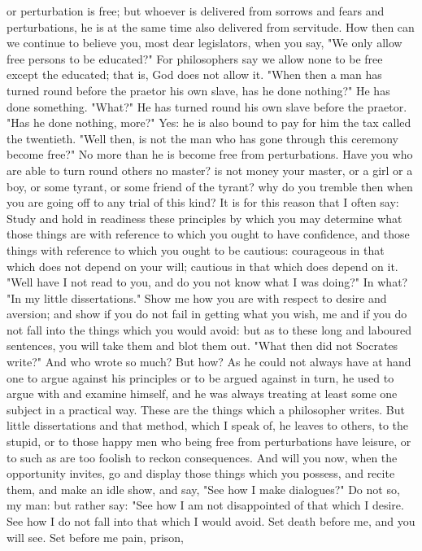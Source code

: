 \documentclass[a4paper]{article}
\begin{document}
or perturbation is free; but whoever is delivered from sorrows and fears and
perturbations, he is at the same time also delivered from servitude. How then
can we continue to believe you, most dear legislators, when you say, "We only
allow free persons to be educated?" For philosophers say we allow none to be
free except the educated; that is, God does not allow it. "When then a man has
turned round before the praetor his own slave, has he done nothing?" He has
done something. "What?" He has turned round his own slave before the praetor.
"Has he done nothing, more?" Yes: he is also bound to pay for him the tax
called the twentieth. "Well then, is not the man who has gone through this
ceremony become free?" No more than he is become free from perturbations. Have
you who are able to turn round others no master? is not money your master, or a
girl or a boy, or some tyrant, or some friend of the tyrant? why do you tremble
then when you are going off to any trial of this kind? It is for this reason
that I often say: Study and hold in readiness these principles by which you may
determine what those things are with reference to which you ought to have
confidence, and those things with reference to which you ought to be cautious:
courageous in that which does not depend on your will; cautious in that which
does depend on it.
    "Well have I not read to you, and do you not know what I was doing?" In
what? "In my little dissertations." Show me how you are with respect to desire
and aversion; and show if you do not fail in getting what you wish, me and if
you do not fall into the things which you would avoid: but as to these long and
laboured sentences, you will take them and blot them out.
    "What then did not Socrates write?" And who wrote so much? But how? As he
could not always have at hand one to argue against his principles or to be
argued against in turn, he used to argue with and examine himself, and he was
always treating at least some one subject in a practical way. These are the
things which a philosopher writes. But little dissertations and that method,
which I speak of, he leaves to others, to the stupid, or to those happy men who
being free from perturbations have leisure, or to such as are too foolish to
reckon consequences.
    And will you now, when the opportunity invites, go and display those things
which you possess, and recite them, and make an idle show, and say, "See how I
make dialogues?" Do not so, my man: but rather say: "See how I am not
disappointed of that which I desire. See how I do not fall into that which I
would avoid. Set death before me, and you will see. Set before me pain, prison,
\end{document}
